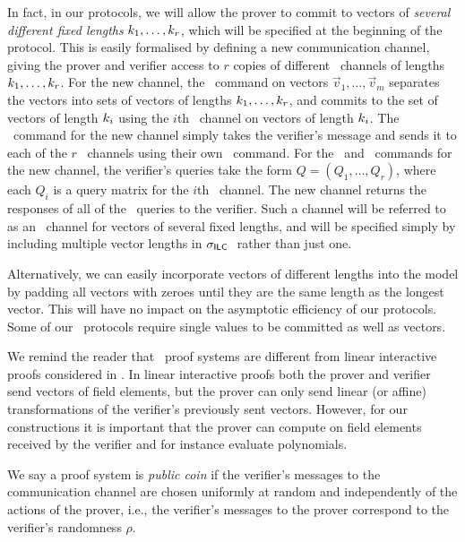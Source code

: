 In fact, in our protocols, we will allow the prover to commit to vectors of \emph{several different fixed lengths} $k_1,\ldots,k_r$, which will be specified at the beginning of the protocol. This is easily formalised by defining a new communication channel, giving the prover and verifier access to $r$ copies of different \ILC\ channels of lengths $k_1,\ldots,k_r$. For the new channel, the \ILCcommit\ command on vectors $\vec{v}_1,\ldots,\vec{v}_m$ separates the vectors into sets of vectors of lengths $k_1,\ldots,k_r$, and commits to the set of vectors of length $k_i$ using the $i$th \ILC\ channel on vectors of length $k_i$. The \ILCsend\ command for the new channel simply takes the verifier's message and sends it to each of the $r$ \ILC\ channels using their own \ILCsend\ command. For the \ILCopen\ and \ILCcheck\ commands for the new channel, the verifier's queries take the form $Q = (Q_1,\ldots,Q_r)$, where each $Q_i$ is a query matrix for the $i$th \ILC\ channel. The new channel returns the responses of all of the \ILC\ queries to the verifier. Such a channel will be referred to as an \ILC\ channel for vectors of several fixed lengths, and will be specified simply by including multiple vector lengths in $\mathsf{\sigma}_{\mathsf{ILC}~}$ rather than just one.

Alternatively, we can easily incorporate vectors of different lengths into the model by padding all vectors with zeroes until they are the same length as the longest vector. This will have no impact on the asymptotic efficiency of our protocols. Some of our \ILC\ protocols require single values to be committed as well as vectors. 

We remind the reader that \ILC\ proof systems are different from linear interactive proofs considered in \cite{BitanskyCIPO13}. In linear interactive proofs both the prover and verifier send vectors of field elements, but the prover can only send linear (or affine) transformations of the verifier's previously sent vectors. However, for our constructions it is important that the prover can compute on field elements received by the verifier and for instance evaluate polynomials.

We say a proof system is \emph{public coin} if the verifier's messages to the communication channel are chosen uniformly at random and independently of the actions of the prover, i.e., the verifier's messages to the prover correspond to the verifier's randomness $\rho$.

